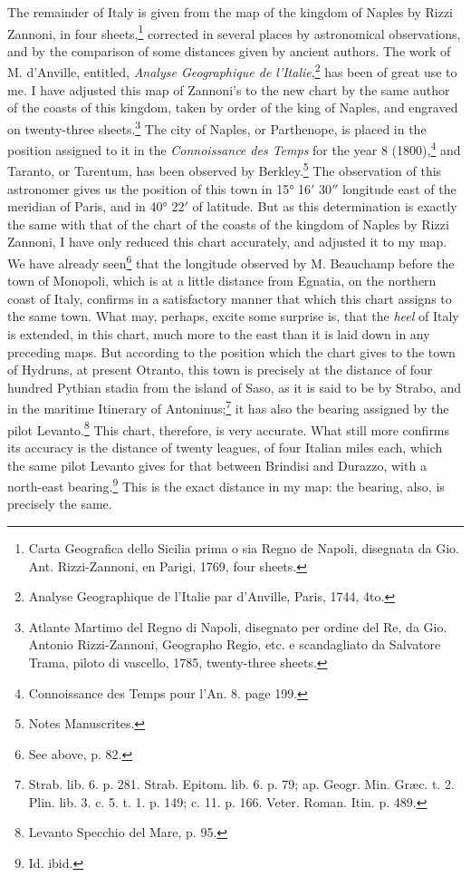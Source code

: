 \documentclass[a4paper, 11pt, oneside, polutonikogreek, english]{article}
\begin{document}
The remainder of Italy is given from the map of the kingdom of Naples by Rizzi Zannoni, in four sheets,\footnote{Carta Geografica dello Sicilia prima o sia Regno de Napoli, disegnata da Gio. Ant. Rizzi-Zannoni, en Parigi, 1769, four sheets.} corrected in several places by astronomical observations, and by the comparison of some distances given by ancient authors. The work of M. d'Anville, entitled, \emph{Analyse Geographique de l'Italie},\footnote{Analyse Geographique de l'Italie par d'Anville, Paris, 1744, 4to.} has been of great use to me. I have adjusted this map of Zannoni's to the new chart by the same author of the coasts of this kingdom, taken by order of the king of Naples, and engraved on twenty-three sheets.\footnote{Atlante Martimo del Regno di Napoli, disegnato per ordine del Re, da Gio. Antonio Rizzi-Zannoni, Geographo Regio, etc. e scandagliato da Salvatore Trama, piloto di vascello, 1785, twenty-three sheets.} The city of Naples, or Parthenope, is placed in the position assigned to it in the \emph{Connoissance des Temps} for the year 8 (1800),\footnote{Connoissance des Temps pour l'An. 8. page 199.} and Taranto, or Tarentum, has been observed by Berkley.\footnote{Notes Manuscrites.} The observation of this astronomer gives us the position of this town in 15° 16$'$ 30$''$ longitude east of the meridian of Paris, and in 40° 22$'$ of latitude. But as this determination is exactly the same with that of the chart of the coasts of the kingdom of Naples by Rizzi Zannoni, I have only reduced this chart accurately, and adjusted it to my map. We have already seen\footnote{See above, p. 82.} that the longitude observed by M. Beauchamp before the town of Monopoli, which is at a little distance from Egnatia, on the northern coast of Italy, confirms in a satisfactory manner that which this chart assigns to the same town. What may, perhaps, excite some surprise is, that the \emph{heel} of Italy is extended, in this chart, much more to the east than it is laid down in any preceding maps. But according to the position which the chart gives to the town of Hydruns, at present Otranto, this town is precisely at the distance of four hundred Pythian stadia from the island of Saso, as it is said to be by Strabo, and in the maritime Itinerary of Antoninus;\footnote{Strab. lib. 6. p. 281. Strab. Epitom. lib. 6. p. 79; ap. Geogr. Min. Græc. t. 2. Plin. lib. 3. c. 5. t. 1. p. 149; c. 11. p. 166. Veter. Roman. Itin. p. 489.} it has also the bearing assigned by the pilot Levanto.\footnote{Levanto Specchio del Mare, p. 95.} This chart, therefore, is very accurate. What still more confirms its accuracy is the distance of twenty leagues, of four Italian miles each, which the same pilot Levanto gives for that between Brindisi and Durazzo, with a north-east bearing.\footnote{Id. ibid.} This is the exact distance in my map: the bearing, also, is precisely the same.
\end{document}
